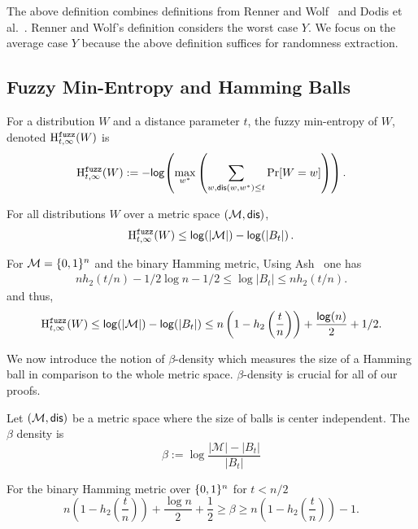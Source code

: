 The above definition combines definitions from Renner and Wolf~\cite{renner2005simple} and Dodis et al.~\cite{dodis2008fuzzy}.  Renner and Wolf's definition considers the worst case $Y$.  We focus on the average case $Y$ because the above definition suffices for randomness extraction.






\subsection{Fuzzy Min-Entropy and Hamming Balls}
\begin{definition}

For a distribution $W$ and a distance parameter $t$, the fuzzy min-entropy of $W$, denoted $\mathrm{H}^{\mathtt{fuzz}}_{t,\infty}(W)$ is 
\[
\mathrm{H}^{\mathtt{fuzz}}_{t,\infty}(W):= -\mathsf{log}\!\left( \max_{w^*} \left(\sum_{w, \mathsf{dis}(w, w^*)\le t} \Pr[W=w] \right)\right).
\]
\end{definition}

\begin{proposition} \label{lem:max fuzz ent}
For all distributions $W$ over a metric space $(\mathcal{M}, \mathsf{dis})$, 
\[\mathrm{H}^{\mathtt{fuzz}}_{t,\infty}(W) \le \mathsf{log}\!\left(|\mathcal{M}|\right) - \mathsf{log}\!\left(|B_t|\right).
\]
\end{proposition}
\noindent
For $\mathcal{M} = \{0, 1\}^n$ and the binary Hamming metric,
Using Ash~\cite[Lemma 4.7.2, Equation 4.7.5, p. 115]{ash2012information} one has
\begin{align} nh_2(t/n)  -1/2\log{n} - 1/2 \le \log{|B_t|} \le  nh_2(t/n)\label{eq:size of balls}.\end{align}
and thus, 
\[
\mathrm{H}^{\mathtt{fuzz}}_{t,\infty}(W) \le \mathsf{log}\!\left(|\mathcal{M}|\right) - \mathsf{log}\!\left(|B_t|\right)\le n\left(1-h_2\left(\frac{t}{n}\right)\right)+ \frac{\mathsf{log}\!\left(n\right)}{2} +1/2.
\]

\noindent
We now introduce the notion of $\beta$-density which measures the size of a Hamming ball in comparison to the whole metric space.  $\beta$-density is crucial for all of our proofs. 
\begin{definition}
Let $(\mathcal{M}, \mathsf{dis})$ be a metric space where the size of balls is center independent.  The $\beta$ density is
\[
\beta := \log{\frac{|\mathcal{M}|- |B_t|}{|B_t|}} 
\]
\label{def:b density}
\end{definition}
\begin{claim} 
For the binary Hamming metric over $\{0, 1\}^n$ for $t<n/2$
\[
n\left(1-h_2\left(\frac{t}{n}\right)\right)+\frac{\log{n}}{2}+\frac{1}{2} \ge \beta \ge n\left(1-h_2\left(\frac{t}{n}\right)\right)-1.
\]

\end{claim}

